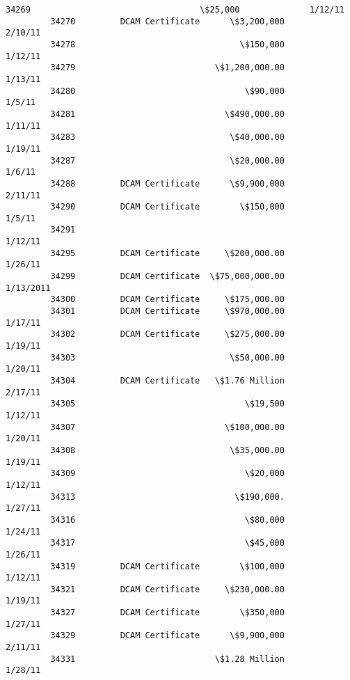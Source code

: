 \documentclass[11pt]{article}
\begin{document}
\begin{Verbatim}[commandchars=\\\{\}]
         34269                                  \$25,000              1/12/11   
         34270         DCAM Certificate      \$3,200,000              2/10/11   
         34278                                 \$150,000              1/12/11   
         34279                            \$1,200,000.00              1/13/11   
         34280                                  \$90,000               1/5/11   
         34281                              \$490,000.00              1/11/11   
         34283                               \$40,000.00              1/19/11   
         34287                               \$20,000.00               1/6/11   
         34288         DCAM Certificate      \$9,900,000              2/11/11   
         34290         DCAM Certificate        \$150,000               1/5/11   
         34291                                                       1/12/11   
         34295         DCAM Certificate     \$200,000.00              1/26/11   
         34299         DCAM Certificate  \$75,000,000.00            1/13/2011   
         34300         DCAM Certificate     \$175,000.00                        
         34301         DCAM Certificate     \$970,000.00              1/17/11   
         34302         DCAM Certificate     \$275,000.00              1/19/11   
         34303                               \$50,000.00              1/20/11   
         34304         DCAM Certificate   \$1.76 Million              2/17/11   
         34305                                  \$19,500              1/12/11   
         34307                              \$100,000.00              1/20/11   
         34308                               \$35,000.00              1/19/11   
         34309                                  \$20,000              1/12/11   
         34313                                \$190,000.              1/27/11   
         34316                                  \$80,000              1/24/11   
         34317                                  \$45,000              1/26/11   
         34319         DCAM Certificate        \$100,000              1/12/11   
         34321         DCAM Certificate     \$230,000.00              1/19/11   
         34327         DCAM Certificate        \$350,000              1/27/11   
         34329         DCAM Certificate      \$9,900,000              2/11/11   
         34331                            \$1.28 Million              1/28/11   
         

\end{Verbatim}
\end{document}
